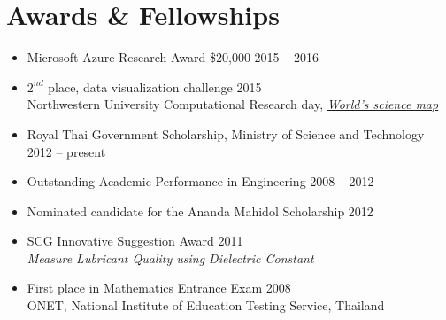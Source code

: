 \section{\sc Awards \& Fellowships}

\begin{itemize}[leftmargin=0cm, label={}]
\itemsep0em

\item Microsoft Azure Research Award \$20,000 \hfill 2015 -- 2016

\item $2^{nd}$ place, data visualization challenge \hfill 2015\\
Northwestern University Computational Research day, {\em \href{http://map.scienceofscience.org}{World's science map}}

\item Royal Thai Government Scholarship, Ministry of Science and Technology \hfill 2012 -- present

\item Outstanding Academic Performance in Engineering \hfill 2008 -- 2012

\item Nominated candidate for the Ananda Mahidol Scholarship \hfill 2012

\item SCG Innovative Suggestion Award \hfill 2011\\
{\em Measure Lubricant Quality using Dielectric Constant}

\item First place in Mathematics Entrance Exam \hfill 2008\\
ONET, National Institute of Education Testing Service, Thailand

\end{itemize}
